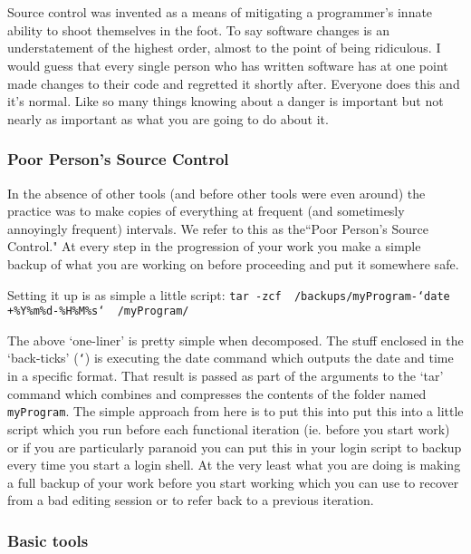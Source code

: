 \chapter[Source Control]{}

Source control was invented as a means of mitigating a programmer's innate ability to shoot themselves in the foot.
To say software changes is an understatement of the highest order, almost to the point of being ridiculous.  I would
guess that every single person who has written software has at one point made changes to their code and regretted it 
shortly after.  Everyone does this and it's normal.  Like so many things knowing about a danger is important but not 
nearly as important as what you are going to do about it.

\subsection{Poor Person's Source Control}{}

In the absence of other tools (and before other tools were even around) the practice was to make copies of everything
at frequent (and sometimesly annoyingly frequent) intervals.  We refer to this as the``Poor Person's Source Control."
At every step in the progression of your work you make a simple backup of what you are working on before proceeding and
put it somewhere safe.

Setting it up is as simple a little script:
	{\tt tar -zcf ~/backups/myProgram-`date +\%Y\%m\%d-\%H\%M\%s` ~/myProgram/}

The above `one-liner' is pretty simple when decomposed.  The stuff enclosed in the
`back-ticks' ({\tt `}) is executing the date command which outputs the date and time
in a specific format.  That result is passed as part of the arguments to the `tar'
command which combines and compresses the contents of the folder named {\tt myProgram}. 
The simple approach from here is to put this
into put this into a little script which you run before each functional iteration
(ie. before you start work) or if you are particularly paranoid you can put this
in your login script to backup every time you start a login shell.  At the very least
what you are doing is making a full backup of your work before you start working
which you can use to recover from a bad editing
session or to refer back to a previous iteration.

\subsection{Basic tools}
